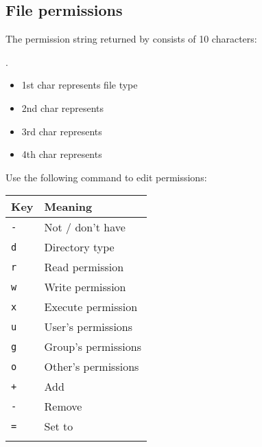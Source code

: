 \documentclass{article}
\begin{document}
\subsection{File permissions}
\begin{minipage}{0.7\textwidth}
    The permission string returned by  consists of 10 characters:

    .
    \begin{itemize}
        \item 1st char represents file type 
        \item 2nd char represents 
        \item 3rd char represents 
        \item 4th char represents 
    \end{itemize}
    Use the following command to edit permissions:

\end{minipage}
\begin{minipage}{0.25\textwidth}
    \begin{table}[H]
        \begin{tabular}{ll}
            \textbf{Key}  & \textbf{Meaning}    \\ \hline
            \lstinline|-| & Not / don't have    \\ \arrayrulecolor{lightgray}\hline
            \lstinline|d| & Directory type      \\ \arrayrulecolor{lightgray}\hline
            \lstinline|r| & Read permission     \\ \arrayrulecolor{lightgray}\hline
            \lstinline|w| & Write permission    \\ \arrayrulecolor{lightgray}\hline
            \lstinline|x| & Execute permission  \\ \arrayrulecolor{lightgray}\hline
            \lstinline|u| & User's permissions  \\ \arrayrulecolor{lightgray}\hline
            \lstinline|g| & Group's permissions \\ \arrayrulecolor{lightgray}\hline
            \lstinline|o| & Other's permissions \\ \arrayrulecolor{lightgray}\hline
            \lstinline|+| & Add                 \\ \arrayrulecolor{lightgray}\hline
            \lstinline|-| & Remove              \\ \arrayrulecolor{lightgray}\hline
            \lstinline|=| & Set to              \\ \arrayrulecolor{lightgray}\hline
        \end{tabular}
    \end{table}

\end{minipage}
\end{document}
